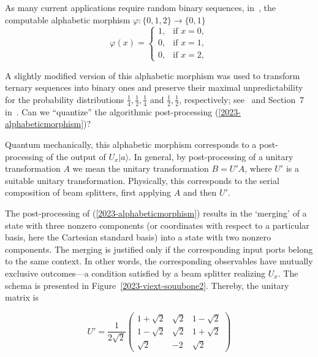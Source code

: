 \documentclass[%
 superscriptaddress,
  preprint,
 showpacs,
 showkeys,
 nofootinbib,
  amsmath,amssymb,
  aps,
 pra,
  longbibliography,
  floatfix,
 ]{revtex4-2}
\theoremstyle{definition}
\begin{document}
 As many current applications require random binary sequences, in~\cite{RSPA23},
 the computable  alphabetic morphism $\varphi \colon \{0,1,2\} \rightarrow \{0,1\}$
 \begin{equation}
 \varphi(x)=
 \begin{cases}1,&\text{if }x=0,
 \\0,&\text{if }x=1,
 \\0, &\text{if } x=2,\end{cases}
\label{2023-alphabeticmorphism}
 \end{equation}

  A slightly modified version of this alphabetic morphism
 was used to
 transform ternary sequences into binary ones and preserve their maximal unpredictability
 for the probability distributions  $\frac{1}{4},\frac{1}{2},\frac{1}{4}$ and $\frac{1}{2},\frac{1}{2}$, respectively;
see~\cite{CALUDE202131} and Section~7 in~\cite{aguero_trejo_new_2021}. Can we ``quantize'' the algorithmic post-processing (\ref{2023-alphabeticmorphism})?




Quantum mechanically, this alphabetic morphism corresponds to a post-processing of the output of $U_x\vert a \rangle$.
In general, by
post-processing of a  unitary transformation $A$ we mean the unitary transformation $B = U'A$, where $U'$ is a suitable unitary transformation.
Physically, this corresponds to the serial composition of beam splitters, first applying $A$ and then $U'$.

The post-processing of (\ref{2023-alphabeticmorphism}) results in the `merging'
of a state with three nonzero components
(or coordinates with respect to a particular basis, here the Cartesian standard basis)
into a state with two
nonzero components. The merging is justified only if the corresponding input ports belong to the same context.
In other words, the corresponding observables have mutually exclusive outcomes---a condition satisfied by a beam splitter realizing $U_x$.
The schema is presented in Figure~\ref{2023-viext-souubone2}.
Thereby,  the unitary matrix is

\begin{equation}
U' =\frac{1}{2\sqrt2}
\begin{pmatrix}
1+\sqrt2& \sqrt2 & 1-\sqrt2\\
1-\sqrt2 & \sqrt2 & 1+\sqrt2 \\
\sqrt2 & -2 & \sqrt2
\end{pmatrix}
\label{2023-viext-upux}
\end{equation}
\end{document}
